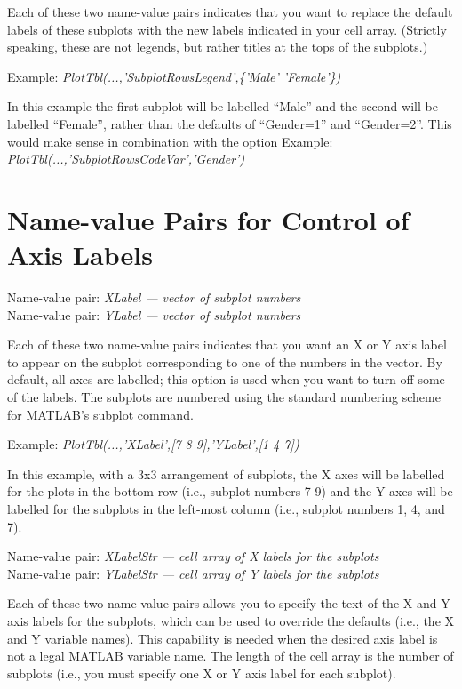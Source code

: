 \documentclass{article}
\newcommand{\example}[1]{Example: {\it #1}}
\newcommand{\namevalue}[2]{{\it #1 --- #2}}
\begin{document}
Each of these two name-value pairs indicates that you want to replace the default labels
of these subplots with the new labels indicated in your cell array.
(Strictly speaking, these are not legends, but rather titles at
the tops of the subplots.)

\example{PlotTbl(...,'SubplotRowsLegend',\{'Male' 'Female'\})}

In this example the first subplot will be labelled ``Male''
and the second will be labelled ``Female'', rather than the defaults of ``Gender=1'' and ``Gender=2''.
This would make sense in combination with the option
\example{PlotTbl(...,'SubplotRowsCodeVar','Gender')}

\section{Name-value Pairs for Control of Axis Labels}

Name-value pair: \namevalue{XLabel}{vector of subplot numbers} \\
Name-value pair: \namevalue{YLabel}{vector of subplot numbers}

Each of these two name-value pairs indicates that you want an X or Y axis label to appear
on the subplot corresponding to one of the numbers in the vector.
By default, all axes are labelled; this option is used when you want to turn off
some of the labels.
The subplots are numbered using the standard numbering scheme for MATLAB's subplot command.

\example{PlotTbl(...,'XLabel',[7 8 9],'YLabel',[1 4 7])}

In this example, with a 3x3 arrangement of subplots, the X axes will
be labelled for the plots in the bottom row (i.e., subplot numbers 7-9) and the Y axes
will be labelled for the subplots in the left-most column (i.e., subplot numbers 1, 4, and 7).

Name-value pair: \namevalue{XLabelStr}{cell array of X labels for the subplots} \\
Name-value pair: \namevalue{YLabelStr}{cell array of Y labels for the subplots}

Each of these two name-value pairs allows you to specify the text of the X and Y axis labels for the
subplots, which can be used to override the defaults (i.e., the X and Y variable names).
This capability is needed when the desired axis label is not a legal MATLAB variable name.
The length of the cell array is the number of subplots (i.e., you must specify
one X or Y axis label for each subplot).
\end{document}
